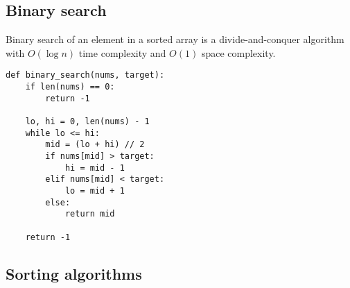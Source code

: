 \documentclass[8pt, table, xcdraw]{article}%
\begin{document}
\subsection{Binary search}

Binary search of an element in a sorted array is a divide-and-conquer algorithm with $O(\log n)$ time complexity and $O(1)$ space complexity.

\begin{lstlisting}
def binary_search(nums, target):
    if len(nums) == 0:
    	return -1
    
    lo, hi = 0, len(nums) - 1
    while lo <= hi:
    	mid = (lo + hi) // 2
    	if nums[mid] > target:
    		hi = mid - 1
    	elif nums[mid] < target:
    		lo = mid + 1
    	else:
    		return mid
    
    return -1
\end{lstlisting}

\subsection{Sorting algorithms}
\end{document}
